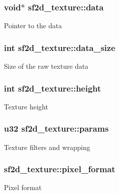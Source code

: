 \subsubsection[{data}]{\setlength{\rightskip}{0pt plus 5cm}void$\ast$ sf2d\+\_\+texture\+::data}\label{structsf2d__texture_a46673c7ce439c63554a23e6ce83b254f}
Pointer to the data \hypertarget{structsf2d__texture_a99107fa90e683bab6456da738ff9d005}{}
\subsubsection[{data\+\_\+size}]{\setlength{\rightskip}{0pt plus 5cm}int sf2d\+\_\+texture\+::data\+\_\+size}\label{structsf2d__texture_a99107fa90e683bab6456da738ff9d005}
Size of the raw texture data \hypertarget{structsf2d__texture_a055ccacd41038339dd1ded72747ccf8f}{}
\subsubsection[{height}]{\setlength{\rightskip}{0pt plus 5cm}int sf2d\+\_\+texture\+::height}\label{structsf2d__texture_a055ccacd41038339dd1ded72747ccf8f}
Texture height \hypertarget{structsf2d__texture_a1c257fef639d35305db19adfc9a0b6f2}{}
\subsubsection[{params}]{\setlength{\rightskip}{0pt plus 5cm}u32 sf2d\+\_\+texture\+::params}\label{structsf2d__texture_a1c257fef639d35305db19adfc9a0b6f2}
Texture filters and wrapping \hypertarget{structsf2d__texture_a1292c9a846b8593163bd3c1eaeb459c2}{}
\subsubsection[{pixel\+\_\+format}]{ sf2d\+\_\+texture\+::pixel\+\_\+format}\label{structsf2d__texture_a1292c9a846b8593163bd3c1eaeb459c2}
Pixel format \hypertarget{structsf2d__texture_ac30cfc2de337739d1a19858e4fdacaa4}{}
